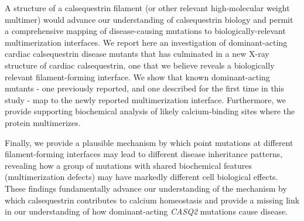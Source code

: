 A structure of a calsequestrin filament (or other relevant high-molecular weight multimer) would advance our understanding of calsequestrin biology and permit a comprehensive mapping of disease-causing mutations to biologically-relevant multimerization interfaces. We report here an investigation of dominant-acting cardiac calsequestrin disease mutants that has culminated in a new X-ray structure of cardiac calsequestrin, one that we believe reveals a biologically relevant filament-forming interface. We show that known dominant-acting mutants - one previously reported, and one described for the first time in this study - map to the newly reported multimerization interface. Furthermore, we provide supporting biochemical analysis of likely calcium-binding sites where the protein multimerizes. 
\begin{hlbreakable}
Finally, we provide a plausible mechanism by which point mutations at different filament-forming interfaces may lead to different disease inheritance patterns, revealing how a group of mutations with shared biochemical features (multimerization defects) may have markedly different cell biological effects. These findings fundamentally advance our understanding of the mechanism by which calsequestrin contributes to calcium homeostasis and provide a missing link in our understanding of how dominant-acting \textit{CASQ2} mutations cause disease.
\end{hlbreakable}





